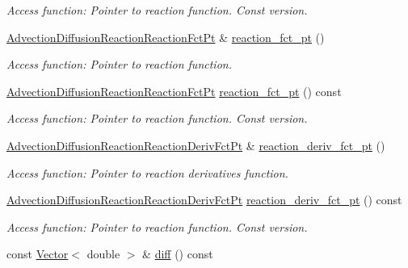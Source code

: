 \begin{DoxyCompactItemize}
\begin{DoxyCompactList}\small\item\em Access function\+: Pointer to reaction function. Const version. \end{DoxyCompactList}\item 
\hyperlink{classoomph_1_1AdvectionDiffusionReactionEquations_a74f8f0492147a5600b075cc64479f850}{Advection\+Diffusion\+Reaction\+Reaction\+Fct\+Pt} \& \hyperlink{classoomph_1_1AdvectionDiffusionReactionEquations_a4c7f533fafad4d0db6f2e4cf0b3f97ca}{reaction\+\_\+fct\+\_\+pt} ()
\begin{DoxyCompactList}\small\item\em Access function\+: Pointer to reaction function. \end{DoxyCompactList}\item 
\hyperlink{classoomph_1_1AdvectionDiffusionReactionEquations_a74f8f0492147a5600b075cc64479f850}{Advection\+Diffusion\+Reaction\+Reaction\+Fct\+Pt} \hyperlink{classoomph_1_1AdvectionDiffusionReactionEquations_a45552eb74d1da4b7c21c7e71b95faa3f}{reaction\+\_\+fct\+\_\+pt} () const
\begin{DoxyCompactList}\small\item\em Access function\+: Pointer to reaction function. Const version. \end{DoxyCompactList}\item 
\hyperlink{classoomph_1_1AdvectionDiffusionReactionEquations_af7afb472439d8e83b825c0a3c03190a7}{Advection\+Diffusion\+Reaction\+Reaction\+Deriv\+Fct\+Pt} \& \hyperlink{classoomph_1_1AdvectionDiffusionReactionEquations_a26fd863a25ebcff9dfb17ea3fa3c99ee}{reaction\+\_\+deriv\+\_\+fct\+\_\+pt} ()
\begin{DoxyCompactList}\small\item\em Access function\+: Pointer to reaction derivatives function. \end{DoxyCompactList}\item 
\hyperlink{classoomph_1_1AdvectionDiffusionReactionEquations_af7afb472439d8e83b825c0a3c03190a7}{Advection\+Diffusion\+Reaction\+Reaction\+Deriv\+Fct\+Pt} \hyperlink{classoomph_1_1AdvectionDiffusionReactionEquations_ab015795d32200187c4ff16b63ef04066}{reaction\+\_\+deriv\+\_\+fct\+\_\+pt} () const
\begin{DoxyCompactList}\small\item\em Access function\+: Pointer to reaction function. Const version. \end{DoxyCompactList}\item 
const \hyperlink{classoomph_1_1Vector}{Vector}$<$ double $>$ \& \hyperlink{classoomph_1_1AdvectionDiffusionReactionEquations_ad59a0d4f89e443358553e4802233dc1d}{diff} () const

\end{DoxyCompactItemize}

